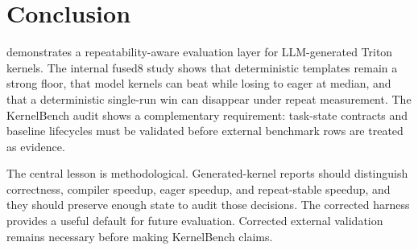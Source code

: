 \section{Conclusion}

\okf{} demonstrates a repeatability-aware evaluation layer for LLM-generated Triton kernels. The internal fused8 study shows that deterministic templates remain a strong floor, that model kernels can beat \compile{} while losing to eager at median, and that a deterministic single-run win can disappear under repeat measurement. The KernelBench audit shows a complementary requirement: task-state contracts and baseline lifecycles must be validated before external benchmark rows are treated as evidence.

The central lesson is methodological. Generated-kernel reports should distinguish correctness, compiler speedup, eager speedup, and repeat-stable speedup, and they should preserve enough state to audit those decisions. The corrected harness provides a useful default for future evaluation. Corrected external validation remains necessary before making KernelBench claims.

